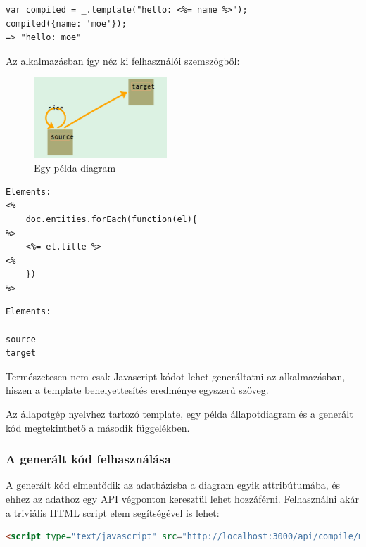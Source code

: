 \begin{lstlisting}[caption=Underscore template lefordítása]
var compiled = _.template("hello: <%= name %>");
compiled({name: 'moe'});
=> "hello: moe"
\end{lstlisting}

Az alkalmazásban így néz ki felhasználói szemszögből:

\begin{figure}[!ht]
\centering
\includegraphics[width=5cm,keepaspectratio]{figures/simple-graph.png}
\caption{Egy példa diagram}
\label{fig:compileseq}
\end{figure}

\begin{lstlisting}[caption=A gráftranszformációs Underscore template]
Elements: 
<% 
    doc.entities.forEach(function(el){
%>
    <%= el.title %>
<%
    })
%>
\end{lstlisting}


\begin{lstlisting}[language=HTML,caption=Az eredmény]
Elements: 

source
target
\end{lstlisting}

Természetesen nem csak Javascript kódot lehet generáltatni az alkalmazásban, hiszen a template behelyettesítés eredménye egyszerű szöveg. 

Az állapotgép nyelvhez tartozó template, egy példa állapotdiagram és a generált kód megtekinthető a második függelékben.




\subsubsection{A generált kód felhasználása}

A generált kód elmentődik az adatbázisba a diagram egyik attribútumába, és ehhez az adathoz egy API végponton keresztül lehet hozzáférni. Felhasználni akár a triviális HTML script elem segítségével is lehet:

\begin{lstlisting}[language=HTML]
 <script type="text/javascript" src="http://localhost:3000/api/compile/modules/5242aa48ddda9b0000000001/"></script>
\end{lstlisting}

